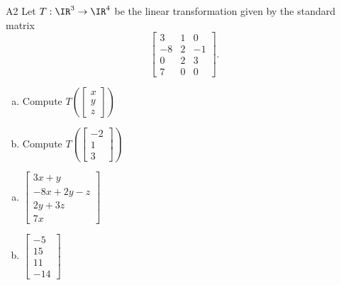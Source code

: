 \begin{problem}{A2}
Let $T: \IR^3\rightarrow \IR^4$ be the linear transformation given by the standard matrix
$$\begin{bmatrix} 3 & 1 & 0 \\ -8 & 2 & -1 \\ 0 & 2 & 3 \\ 7 & 0 & 0 \end{bmatrix}.$$
\begin{enumerate}[(a)]
\item Compute \( T\left( \begin{bmatrix}x\\ y \\ z \end{bmatrix} \right) \)
\item Compute \( T\left( \begin{bmatrix}-2 \\ 1 \\ 3 \end{bmatrix} \right) \)
\end{enumerate}
\end{problem}
\begin{solution}
\begin{enumerate}[(a)]
\item \(\begin{bmatrix} 3x+y \\ -8x+2y-z \\ 2y+3z \\ 7x \end{bmatrix}\)
\item \(\begin{bmatrix} -5 \\ 15 \\ 11 \\ -14 \end{bmatrix}\)
\end{enumerate}
\end{solution}

